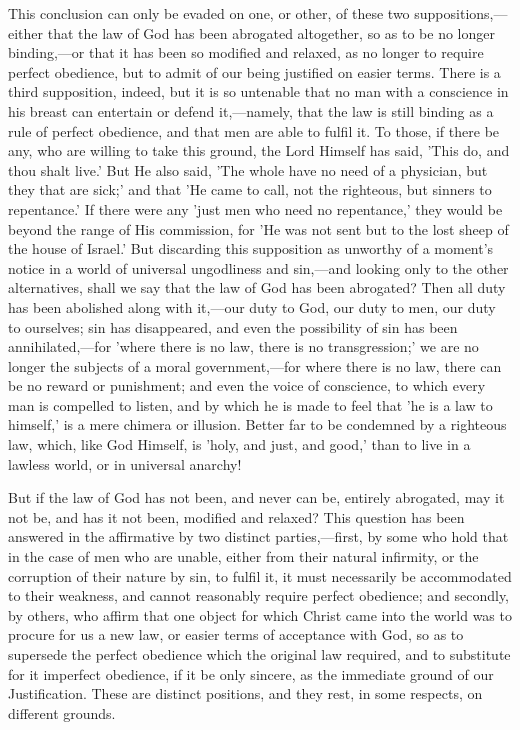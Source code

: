 \documentclass[
]{book}
\begin{document}
This conclusion can only be evaded on one, or other, of these two suppositions,---either that the law of God has been abrogated altogether, so as to be no longer binding,---or that it has been so modified and relaxed, as no longer to require perfect obedience, but to admit of our being justified on easier terms. There is a third supposition, indeed, but it is so untenable that no man with a conscience in his breast can entertain or defend it,---namely, that the law is still binding as a rule of perfect obedience, and that men are able to fulfil it. To those, if there be any, who are willing to take this ground, the Lord Himself has said, 'This do, and thou shalt live.' But He also said, 'The whole have no need of a physician, but they that are sick;' and that 'He came to call, not the righteous, but sinners to repentance.' If there were any 'just men who need no repentance,' they would be beyond the range of His commission, for 'He was not sent but to the lost sheep of the house of Israel.' But discarding this supposition as unworthy of a moment's notice in a world of universal ungodliness and sin,---and looking only to the other alternatives, shall we say that the law of God has been abrogated? Then all duty has been abolished along with it,---our duty to God, our duty to men, our duty to ourselves; sin has disappeared, and even the possibility of sin has been annihilated,---for 'where there is no law, there is no transgression;' we are no longer the subjects of a moral government,---for where there is no law, there can be no reward or punishment; and even the voice of conscience, to which every man is compelled to listen, and by which he is made to feel that 'he is a law to himself,' is a mere chimera or illusion. Better far to be condemned by a righteous law, which, like God Himself, is 'holy, and just, and good,' than to live in a lawless world, or in universal anarchy!

But if the law of God has not been, and never can be, entirely abrogated, may it not be, and has it not been, modified and relaxed? This question has been answered in the affirmative by two distinct parties,---first, by some who hold that in the case of men who are unable, either from their natural infirmity, or the corruption of their nature by sin, to fulfil it, it must necessarily be accommodated to their weakness, and cannot reasonably require perfect obedience; and secondly, by others, who affirm that one object for which Christ came into the world was to procure for us a new law, or easier terms of acceptance with God, so as to supersede the perfect obedience which the original law required, and to substitute for it imperfect obedience, if it be only sincere, as the immediate ground of our Justification. These are distinct positions, and they rest, in some respects, on different grounds.
\end{document}
